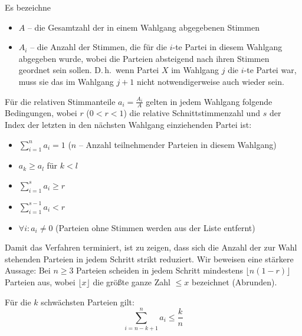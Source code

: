 Es bezeichne

\begin{itemize}[label={}]
  \item $A$ -- die Gesamtzahl der in einem Wahlgang abgegebenen Stimmen
  \item $A_i$ -- die Anzahl der Stimmen, die für die $i$-te Partei in diesem Wahlgang abgegeben
    wurde, wobei die Parteien absteigend nach ihren Stimmen geordnet sein sollen. D.\,h.\ wenn
    Partei $X$ im Wahlgang $j$ die $i$-te Partei war, muss sie das im Wahlgang $j+1$ nicht
    notwendigerweise auch wieder sein.
\end{itemize}

Für die relativen Stimmanteile $a_i = \frac{A_i}{A}$ gelten in jedem Wahlgang folgende
Bedingungen, wobei $r$ ($0 < r < 1$) die relative Schnittstimmenzahl und $s$ der Index der
letzten in den nächsten Wahlgang einziehenden Partei ist:

\begin{itemize}[label={}]
  \item[(I)]   $\displaystyle\sum_{i=1}^{n} a_i = 1$
    \quad ($n$ -- Anzahl teilnehmender Parteien in diesem Wahlgang)
  \item[(II)]  $a_k \geq a_l$ \quad für $k < l$
  \item[(III)] $\displaystyle\sum_{i=1}^{s} a_i \geq r$
  \item[(IV)]  $\displaystyle\sum_{i=1}^{s-1} a_i < r$
  \item[\phantom{(IV)}] $\forall i: a_i \neq 0$ \quad
    (Parteien ohne Stimmen werden aus der Liste entfernt)
\end{itemize}

Damit das Verfahren terminiert, ist zu zeigen, dass sich die Anzahl der zur Wahl stehenden
Parteien in jedem Schritt strikt reduziert. Wir beweisen eine stärkere Aussage: Bei $n \geq 3$
Parteien scheiden in jedem Schritt mindestens $\lfloor n(1-r) \rfloor$ Parteien aus, wobei
$\lfloor x \rfloor$ die größte ganze Zahl $\leq x$ bezeichnet (Abrunden).

\begin{hilfssatz}
Für die $k$ schwächsten Parteien gilt:
\begin{equation}
  \sum_{i=n-k+1}^{n} a_i \leq \frac{k}{n}
\end{equation}
\end{hilfssatz}

